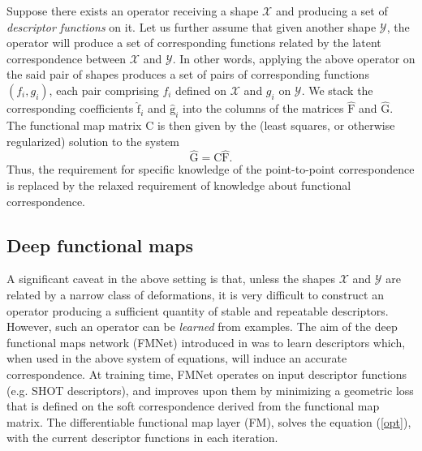 \documentclass[10pt,twocolumn,letterpaper]{article}
\newcommand{\bb}[1]{\bm{\mathrm{#1}}}
\begin{document}
Suppose there exists an operator receiving a shape $\mathcal{X}$ and producing a set of \emph{descriptor functions} on it. Let us further assume that given another shape $\mathcal{Y}$, the operator will produce a set of corresponding functions related by the latent correspondence between $\mathcal{X}$ and $\mathcal{Y}$. 
In other words, applying the above operator on the said pair of shapes produces a set of pairs of corresponding functions $(f_i,g_i)$, each pair comprising  $f_i$ defined on $\mathcal{X}$ and $g_i$ on $\mathcal{Y}$. We stack the corresponding coefficients $\bb{\hat{f}}_i$ and $\bb{\hat{g}}_i$ into the columns of the matrices $\bb{\hat{F}}$ and $\bb{\hat{G}}$. 
The functional map matrix $\bb{C}$ is then given by the (least squares, or otherwise regularized) solution to the system
\begin{equation}
\bb{\hat{G}} = \bb{C} \bb{\hat{F}}.
\label{opt}
\end{equation}
Thus, the requirement for specific knowledge of the point-to-point correspondence is replaced by the relaxed requirement of knowledge about functional correspondence. 




\subsection{Deep functional maps}\label{sec:fmnet}
A significant caveat in the above setting is that, unless the shapes $\mathcal{X}$ and $\mathcal{Y}$ are related by a narrow class of deformations, it is very difficult to construct an operator producing a sufficient quantity of stable and repeatable descriptors. However, such an operator can be \emph{learned} from examples. The aim of the deep functional maps network (FMNet) introduced in \cite{litany2017deep} was to learn descriptors which, when used in the above system of equations, will induce an accurate correspondence. At training time, FMNet operates on input descriptor functions (e.g. SHOT descriptors), and improves upon them by minimizing a geometric loss that is defined on the soft correspondence derived from the functional map matrix. The differentiable functional map layer (FM), solves the equation (\ref{opt}), with the current descriptor functions in each iteration.
\end{document}
